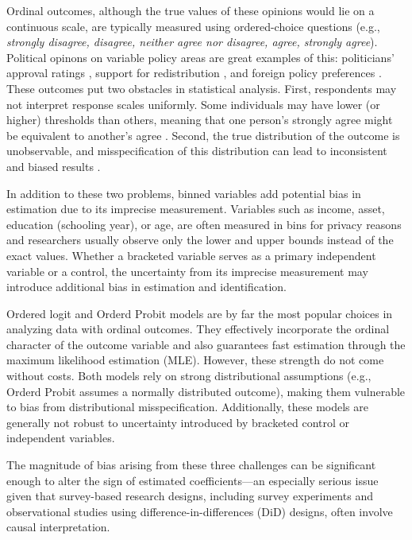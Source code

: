\documentclass{article}
\begin{document}
Ordinal outcomes, although the true values of these opinions would lie on a continuous scale, are typically measured using ordered-choice questions (e.g., \textit{strongly disagree, disagree, neither agree nor disagree, agree, strongly agree}). Political opinons on variable policy areas are great examples of this: politicians’ approval ratings \citep{Canes-Wrone2002a, Kriner2009a}, support for redistribution \citep{Alt2017a, Magni2021a}, and foreign policy preferences \citep{Scheve2001r, Mayda2005a}. These outcomes put two obstacles in statistical analysis. First, respondents may not interpret response scales uniformly. Some individuals may have lower (or higher) thresholds than others, meaning that one person’s strongly agree might be equivalent to another’s agree \citet{King2004a}. Second, the true distribution of the outcome is unobservable, and misspecification of this distribution can lead to inconsistent and biased results \citep{Manski1988a, Greene2010a, Bond2018a}. 

In addition to these two problems, binned variables add potential bias in estimation due to its imprecise measurement. Variables such as income, asset, education (schooling year), or age, are often measured in bins for privacy reasons and researchers usually observe only the lower and upper bounds instead of the exact values. Whether a bracketed variable serves as a primary independent variable or a control, the uncertainty from its imprecise measurement may introduce additional bias in estimation and identification. 

Ordered logit and Orderd Probit models are by far the most popular choices in analyzing data with ordinal outcomes. They effectively incorporate the ordinal character of the outcome variable and also guarantees fast estimation through the maximum likelihood estimation (MLE). However, these strength do not come without costs. Both models rely on strong distributional assumptions (e.g., Orderd Probit assumes a normally distributed outcome), making them vulnerable to bias from distributional misspecification. Additionally, these models are generally not robust to uncertainty introduced by bracketed control or independent variables.

The magnitude of bias arising from these three challenges can be significant enough to alter the sign of estimated coefficients—an especially serious issue given that survey-based research designs, including survey experiments and observational studies using difference-in-differences (DiD) designs, often involve causal interpretation.
\end{document}

